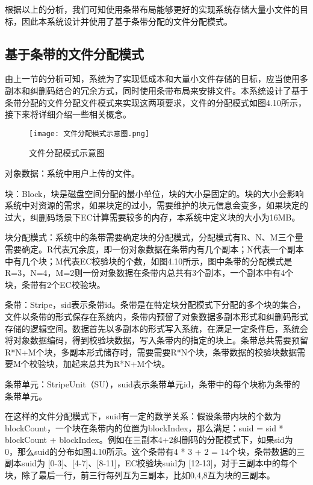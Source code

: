 根据以上的分析，我们可知使用条带布局能够更好的实现系统存储大量小文件的目标，因此本系统设计并使用了基于条带分配的文件分配模式。

\subsection{基于条带的文件分配模式}%
由上一节的分析可知，系统为了实现低成本和大量小文件存储的目标，应当使用多副本和纠删码结合的冗余方式，同时使用条带布局来安排文件。本系统设计了基于条带分配的文件分配文件模式来实现这两项要求，文件的分配模式如图4.10所示，接下来将详细介绍一些相关概念。

\begin{figure}[h]
    \centering
    \texttt{[image: 文件分配模式示意图.png]}
    \caption{文件分配模式示意图}
  \end{figure}

对象数据：系统中用户上传的文件。

块：Block，块是磁盘空间分配的最小单位，块的大小是固定的。块的大小会影响系统中对资源的需求，如果块定的过小，需要维护的块元信息会变多，如果块定的过大，纠删码场景下EC计算需要较多的内存，本系统中定义块的大小为16MB。

块分配模式：系统中的条带需要确定块的分配模式，分配模式有R、N、M三个量需要确定。R代表冗余度，即一份对象数据在条带内有几个副本；N代表一个副本中有几个块；M代表EC校验块的个数，如图4.10所示，图中条带的分配模式是R=3，N=4，M=2则一份对象数据在条带内总共有3个副本，一个副本中有4个块，条带有2个EC校验块。

条带：Stripe，sid表示条带id。条带是在特定块分配模式下分配的多个块的集合，文件以条带的形式保存在系统内，条带内预留了对象数据多副本形式和纠删码形式存储的逻辑空间。数据首先以多副本的形式写入系统，在满足一定条件后，系统会将对象数据编码，得到校验块数据，写入条带内的指定的块上。条带总共需要预留R*N+M个块，多副本形式储存时，需要需要R*N个块，条带数据的校验块数据需要M个校验块，加起来总共为R*N+M个块。

条带单元：StripeUnit（SU），suid表示条带单元id，条带中的每个块称为条带的条带单元。

在这样的文件分配模式下，suid有一定的数学关系：假设条带内块的个数为blockCount，一个块在条带内的位置为blockIndex，那么满足：suid = sid * blockCount + blockIndex。例如在三副本4+2纠删码的分配模式下，如果sid为 0，那么suid的分布如图4.10所示。这个条带有4 * 3 + 2 = 14个块，条带数据的三副本suid为 [0-3]、[4-7]、[8-11]，EC校验块suid为 [12-13]，对于三副本中的每个块，除了最后一行，前三行每列互为三副本，比如0,4,8互为块的三副本。

